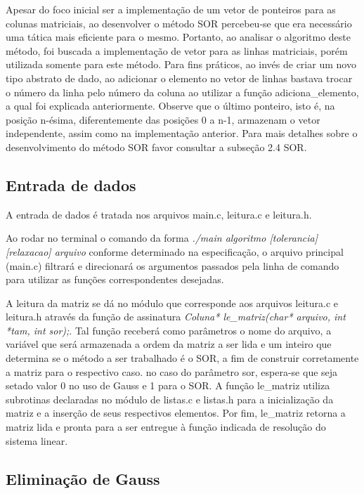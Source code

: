 \documentclass[
	article,			%
	11pt,				%
	oneside,			%
	a4paper,			%
	english,			%
	brazil,				%
	sumario=tradicional
	]{abntex2}
\begin{document}
Apesar do foco inicial ser a implementação de um vetor de ponteiros para as colunas matriciais, ao desenvolver o método SOR percebeu-se que era necessário uma tática mais eficiente para o mesmo. Portanto, ao analisar o algoritmo deste método, foi buscada a implementação de vetor para as linhas matriciais, porém utilizada somente para este método. Para fins práticos, ao invés de criar um novo tipo abstrato de dado, ao adicionar o elemento no vetor de linhas bastava trocar o número da linha pelo número da coluna ao utilizar a função adiciona\_elemento, a qual foi explicada anteriormente. Observe que o último ponteiro, isto é, na posição n-ésima, diferentemente das posições 0 a n-1, armazenam o vetor independente, assim como na implementação anterior. Para mais detalhes sobre o desenvolvimento do método SOR favor consultar a subseção 2.4 SOR.

\subsection{Entrada de dados}

A entrada de dados é tratada nos arquivos main.c, leitura.c e leitura.h. 

Ao rodar no terminal o comando da forma \emph{./main algoritmo [tolerancia] [relaxacao] arquivo} conforme determinado na especificação, o arquivo principal (main.c) filtrará e direcionará os argumentos passados pela linha de comando para utilizar as funções correspondentes desejadas.

A leitura da matriz se dá no módulo que corresponde aos arquivos leitura.c e leitura.h através da função de assinatura \emph{Coluna* le\_matriz(char* arquivo, int *tam, int sor);}. Tal função receberá como parâmetros o nome do arquivo, a variável que será armazenada a ordem da matriz a ser lida e um inteiro que determina se o método a ser trabalhado é o SOR, a fim de construir corretamente a matriz para o respectivo caso. no caso do parâmetro sor, espera-se que seja setado valor 0 no uso de Gauss e 1 para o SOR. A função le\_matriz utiliza subrotinas declaradas no módulo de listas.c e listas.h para a inicialização da matriz e a inserção de seus respectivos elementos. Por fim, le\_matriz retorna a matriz lida e pronta para a ser entregue à função indicada de resolução do sistema linear.

\subsection{Eliminação de Gauss}
\end{document}

